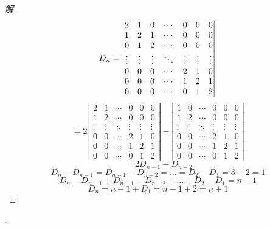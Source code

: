 \documentclass[10pt,a4paper]{report}
\begin{document}
\begin{proof}[解]
	$$
	D_{n} = \left|
	\begin{matrix}
	2 & 1 & 0 & \cdots & 0 & 0 & 0\\
	1 & 2 & 1 & \cdots & 0 & 0 & 0\\
	0 & 1 & 2 & \cdots & 0 & 0 & 0\\
	\vdots & \vdots & \vdots & \ddots & \vdots & \vdots & \vdots \\
	0 & 0 & 0 & \cdots & 2 & 1 & 0 \\
	0 & 0 & 0 & \cdots & 1 & 2 & 1\\
	0 & 0 & 0 & \cdots & 0 & 1 & 2
	\end{matrix}
	\right|\\
	$$
	$$
	=2\left|
	\begin{matrix}
	2 & 1 & \cdots & 0 & 0 & 0\\
	1 & 2 & \cdots & 0 & 0 & 0\\
	\vdots & \vdots & \ddots &\vdots & \vdots & \vdots \\
	0 & 0 & \cdots & 2 & 1 & 0 \\
	0 & 0 & \cdots & 1 & 2 & 1\\
	0 & 0 & \cdots & 0 & 1 & 2
	\end{matrix}
	\right|
	-\left|
	\begin{matrix}
	1 & 0 & \cdots & 0 & 0 & 0\\
	1 & 2 & \cdots & 0 & 0 & 0\\
	\vdots & \vdots & \ddots & \vdots & \vdots & \vdots \\
	0 & 0 & \cdots & 2 & 1 & 0 \\
	0 & 0 & \cdots & 1 & 2 & 1\\
	0 & 0 & \cdots & 0 & 1 & 2
	\end{matrix}
	\right|
	$$
	$$
	=2D_{n-1}-D_{n-2}
	$$
	$$
	D_{n}-D_{n-1} = D_{n-1}-D_{n-2} = ... = D_{2}-D_{1} = 3-2 = 1
	$$
	$$
	D_{n}-D_{n-1} + D_{n-1}-D_{n-2} + ... + D_{2}-D_{1} = n-1
	$$
	$$
	D_{n} = n-1+D_{1} = n-1+2 = n+1
	$$
\end{proof}
.
\end{document}
